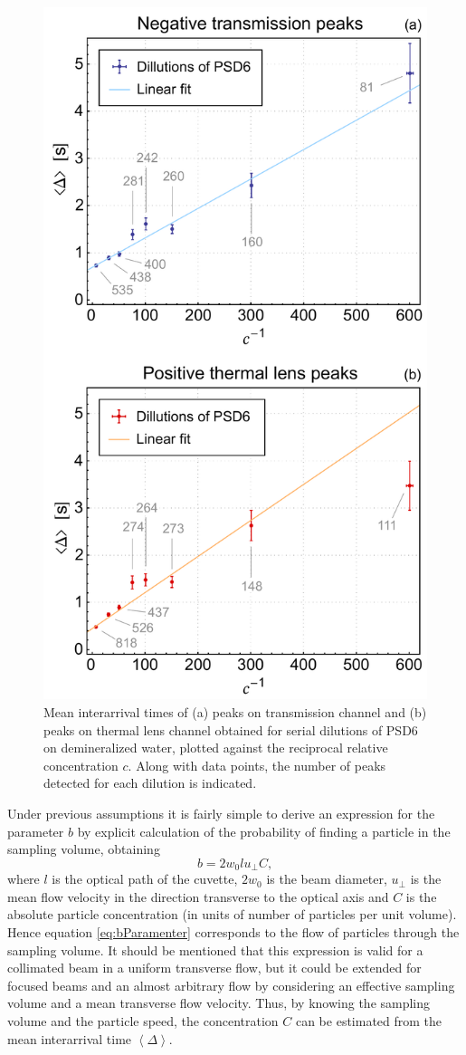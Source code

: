 \documentclass[9pt,twocolumn,twoside]{osajnl}
\begin{document}
\begin{figure}[t!]
	\centering \includegraphics[width=.49\textwidth]{figures/InterarrivalTimes.pdf}
	\caption{Mean interarrival times of (a) peaks on transmission channel and (b) peaks on thermal lens channel obtained for serial dilutions of PSD6 on demineralized water, plotted against the reciprocal relative concentration $c$. Along with data points, the number of peaks detected for each dilution is indicated.}
	\label{fig:InterarrivalTimes}
\end{figure}

Under previous assumptions it is fairly simple to derive an expression for the parameter $b$ by explicit calculation of the probability of finding a particle in the sampling volume, obtaining
\begin{equation}
	b = 2 w_0 l u_\perp C,
\label{eq:bParamenter}
\end{equation}
where $l$ is the optical path of the cuvette, $2 w_0$ is the beam diameter, $u_\perp$ is the mean flow velocity in the direction transverse to the optical axis and $C$ is the absolute particle concentration (in units of number of particles per unit volume). Hence equation \ref{eq:bParamenter} corresponds to the flow of particles through the sampling volume. It should be mentioned that this expression is valid for a collimated beam in a uniform transverse flow, but it could be extended for focused beams and an almost arbitrary flow by considering an effective sampling volume and a mean transverse flow velocity. Thus, by knowing the sampling volume and the particle speed, the concentration $C$ can be estimated from the mean interarrival time $\left\langle \Delta \right\rangle$.
\end{document}
